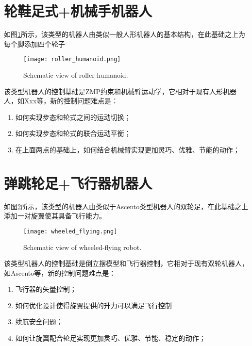 \section[轮鞋足式+机械手机器人]{轮鞋足式+机械手机器人}
如图\ref{fig:roller_humanoid}所示，该类型的机器人由类似一般人形机器人的基本结构，在此基础之上为每个脚添加四个轮子

\begin{figure}
  \centering
  \texttt{[image: roller\_humanoid.png]}
  \caption[roller_humanoid]{Schematic view of roller humanoid.}
  \label{fig:roller_humanoid}
\end{figure}

该类型机器人的控制基础是ZMP约束和机械臂运动学，它相对于现有人形机器人，如Xxx等，新的控制问题难点是：
\begin{enumerate}
  \item 如何实现步态和轮式之间的运动切换；
  \item 如何实现步态和轮式的联合运动平衡；
  \item 在上面两点的基础上，如何结合机械臂实现更加灵巧、优雅、节能的动作；
\end{enumerate}

\section[弹跳轮足+飞行器机器人]{弹跳轮足+飞行器机器人}
如图\ref{fig:wheeled_flying}所示，该类型的机器人由类似于Ascento\cite[p1]{Klemm_Morra_Salzmann_Tschopp_Bodie_Gulich_Kung_Mannhart_Pfister_Vierneisel_et_al_2019}类型机器人的双轮足，在此基础之上添加一对旋翼使其具备飞行能力。

\begin{figure}
  \centering
  \texttt{[image: wheeled\_flying.png]}
  \caption[short]{Schematic view of wheeled-flying robot.}
  \label{fig:wheeled_flying}
\end{figure}

该类型机器人的控制基础是倒立摆模型和飞行器控制，它相对于现有双轮机器人，如Ascento\cite[p1]{Klemm_Morra_Salzmann_Tschopp_Bodie_Gulich_Kung_Mannhart_Pfister_Vierneisel_et_al_2019}等，新的控制问题难点是：
\begin{enumerate}
  \item 飞行器的矢量控制；
  \item 如何优化设计使得旋翼提供的升力可以满足飞行控制
  \item 续航安全问题；
  \item 如何让旋翼配合轮足实现更加灵巧、优雅、节能、稳定的动作；
\end{enumerate}

